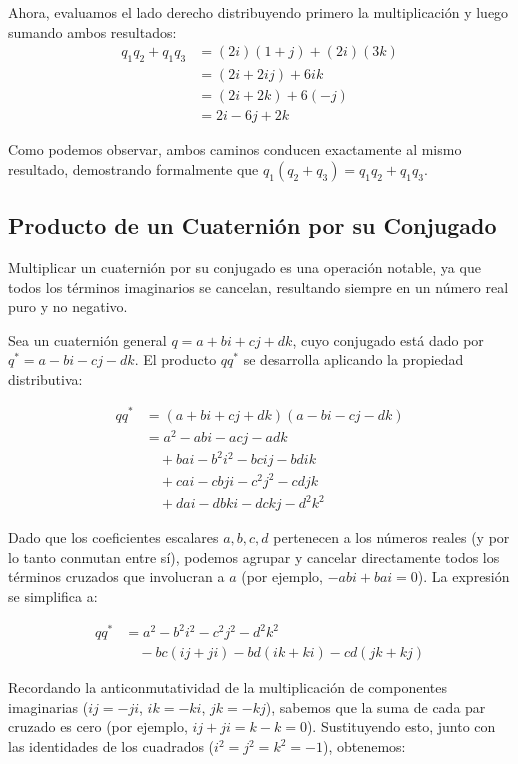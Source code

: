 Ahora, evaluamos el lado derecho distribuyendo primero la multiplicación y luego sumando ambos resultados:
\begin{align*}
    q_1 q_2 + q_1 q_3 &= (2i)(1 + j) + (2i)(3k) \\
    &= (2i + 2ij) + 6ik \\
    &= (2i + 2k) + 6(-j) \\
    &= 2i - 6j + 2k
\end{align*}

Como podemos observar, ambos caminos conducen exactamente al mismo resultado, demostrando formalmente que $q_1 (q_2 + q_3) = q_1 q_2 + q_1 q_3$.


\subsection{Producto de un Cuaternión por su Conjugado}
Multiplicar un cuaternión por su conjugado es una operación notable, ya que todos los términos imaginarios se cancelan, resultando siempre en un número real puro y no negativo.

Sea un cuaternión general $q = a + bi + cj + dk$, cuyo conjugado está dado por $q^* = a - bi - cj - dk$. El producto $q q^*$ se desarrolla aplicando la propiedad distributiva:

\begin{align*}
    q q^* &= (a + bi + cj + dk)(a - bi - cj - dk) \\
    &= a^2 - abi - acj - adk \\
    &\quad + bai - b^2i^2 - bcij - bdik \\
    &\quad + cai - cbji - c^2j^2 - cdjk \\
    &\quad + dai - dbki - dckj - d^2k^2
\end{align*}

Dado que los coeficientes escalares $a, b, c, d$ pertenecen a los números reales (y por lo tanto conmutan entre sí), podemos agrupar y cancelar directamente todos los términos cruzados que involucran a $a$ (por ejemplo, $-abi + bai = 0$). La expresión se simplifica a:

\begin{align*}
    q q^* &= a^2 - b^2i^2 - c^2j^2 - d^2k^2 \\
    &\quad - bc(ij + ji) - bd(ik + ki) - cd(jk + kj)
\end{align*}

Recordando la anticonmutatividad de la multiplicación de componentes imaginarias ($ij = -ji$, $ik = -ki$, $jk = -kj$), sabemos que la suma de cada par cruzado es cero (por ejemplo, $ij + ji = k - k = 0$). Sustituyendo esto, junto con las identidades de los cuadrados ($i^2 = j^2 = k^2 = -1$), obtenemos:

